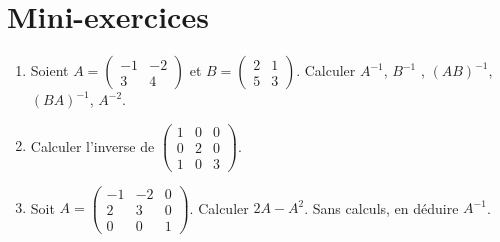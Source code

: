 \section{Mini-exercices}

\begin{frame}

\begin{miniexercice}
\begin{enumerate}
  \item Soient $A=\left(\begin{smallmatrix}-1 & -2 \\ 3  & 4 \end{smallmatrix}\right)$
  et $B = \left(\begin{smallmatrix}2 & 1 \\ 5  & 3 \end{smallmatrix}\right)$. Calculer
  $A^{-1}$, $B^{-1}$ , $(AB)^{-1}$, $(BA)^{-1}$, $A^{-2}$.
  
  \item Calculer l'inverse de $\left(\begin{smallmatrix}1&0&0\\0&2&0\\1&0&3\end{smallmatrix}\right)$.
  
  \item Soit $A=\left(\begin{smallmatrix}-1&-2&0\\2&3&0\\0&0&1\end{smallmatrix}\right)$.
  Calculer $2A-A^2$. Sans calculs, en déduire $A^{-1}$.

\end{enumerate}
\end{miniexercice}

\end{frame}

